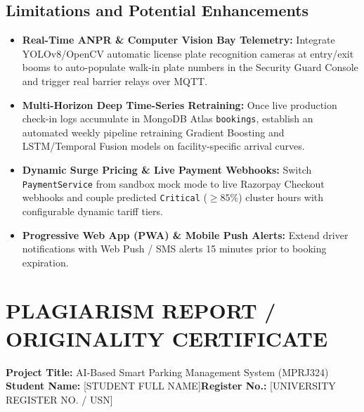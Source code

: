 \documentclass[12pt,a4paper,oneside]{report}
\newcommand{\studentname}{[STUDENT FULL NAME]}
\newcommand{\studentusn}{[UNIVERSITY REGISTER NO. / USN]}
\begin{document}
\section{Limitations and Potential Enhancements}
\begin{itemize}[leftmargin=*]
  \item \textbf{Real-Time ANPR \& Computer Vision Bay Telemetry:} Integrate YOLOv8/OpenCV automatic license plate recognition cameras at entry/exit booms to auto-populate walk-in plate numbers in the Security Guard Console and trigger real barrier relays over MQTT.
  \item \textbf{Multi-Horizon Deep Time-Series Retraining:} Once live production check-in logs accumulate in MongoDB Atlas \texttt{bookings}, establish an automated weekly pipeline retraining Gradient Boosting and LSTM/Temporal Fusion models on facility-specific arrival curves.
  \item \textbf{Dynamic Surge Pricing \& Live Payment Webhooks:} Switch \texttt{PaymentService} from sandbox mock mode to live Razorpay Checkout webhooks and couple predicted \texttt{Critical} ($\ge 85\%$) cluster hours with configurable dynamic tariff tiers.
  \item \textbf{Progressive Web App (PWA) \& Mobile Push Alerts:} Extend driver notifications with Web Push / SMS alerts 15 minutes prior to booking expiration.
\end{itemize}

\chapter*{PLAGIARISM REPORT / ORIGINALITY CERTIFICATE}

\noindent\textbf{Project Title:} AI-Based Smart Parking Management System (MPRJ324) \\
\textbf{Student Name:} \studentname \hfill \textbf{Register No.:} \studentusn \\[1cm]
\end{document}
